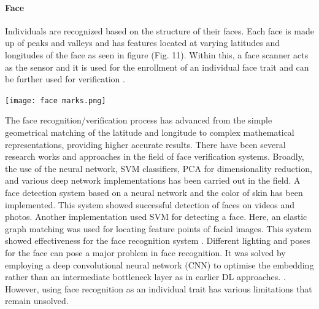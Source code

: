 \documentclass[a4paper, 12pt]{article}
\begin{document}
\paragraph{Face}
Individuals are recognized based on the structure of their faces. Each face is made up of peaks and valleys and has features located at varying latitudes and longitudes of the face as seen in figure (Fig. 11). Within this, a face scanner acts as the sensor and it is used for the enrollment of an individual face trait and can be further used for verification \cite{oloyede:2016}. 
\vskip 0.2in
\begin{center}
\texttt{[image: face marks.png]}
\end{center}
\vskip 0.2in
\noindent The face recognition/verification process has advanced from the simple geometrical matching of the latitude and longitude to complex mathematical representations, providing higher accurate results. There have been several research works and approaches in the field of face verification systems. Broadly, the use of the neural network, SVM classifiers, PCA for dimensionality reduction, and various deep network implementations has been carried out in the field.  
\vskip 0.2in
\noindent A face detection system based on a neural network and the color of skin has been implemented. This system showed successful detection of faces on videos and photos. Another implementation used SVM for detecting a face. Here, an elastic graph matching was used for locating feature points of facial images. This system showed effectiveness for the face recognition system \cite{oloyede:2016}. Different lighting and poses for the face can pose a major problem in face recognition. It was solved by employing a deep convolutional neural network (CNN) to optimise the embedding rather than an intermediate bottleneck layer as in earlier DL approaches. \cite{schroff:2015}. However, using face recognition as an individual trait has various limitations that remain unsolved. 
\vskip 0.2in
\end{document}
